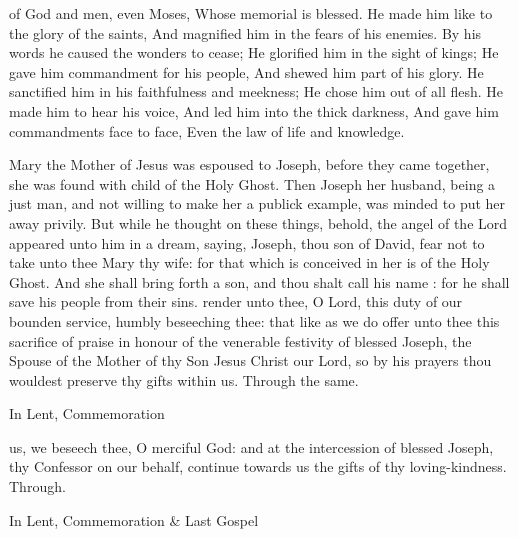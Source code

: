  of God and men, even Moses, Whose memorial is blessed. He made him like to the glory of the saints, And magnified him in the fears of his enemies. By his words he caused the wonders to cease; He glorified him in the sight of kings; He gave him commandment for his people, And shewed him part of his glory. He sanctified him in his faithfulness and meekness; He chose him out of all flesh. He made him to hear his voice, And led him into the thick darkness, And gave him commandments face to face, Even the law of life and knowledge.


\clearpage
{}
 Mary the Mother of Jesus was espoused to Joseph, before they came together, she was found with child of the Holy Ghost. Then Joseph her husband, being a just man, and not willing to make her a publick example, was minded to put her away privily. But while he thought on these things, behold, the angel of the Lord appeared unto him in a dream, saying, Joseph, thou son of David, fear not to take unto thee Mary thy wife: for that which is conceived in her is of the Holy Ghost. And she shall bring forth a son, and thou shalt call his name : for he shall save his people from their sins.
\secret
{} render unto thee, O Lord, this duty of our bounden service, humbly beseeching thee: that like as we do offer unto thee this sacrifice of praise in honour of the venerable festivity of blessed Joseph, the Spouse of the Mother of thy Son Jesus Christ our Lord, so by his prayers thou wouldest preserve thy gifts within us. Through the same.
\begin{rubric}
    In Lent, Commemoration 
\end{rubric}
\postcommunion
{} us, we beseech thee, O merciful God: and at the intercession of blessed Joseph, thy Confessor on our behalf, continue towards us the gifts of thy loving-kindness. Through.
\begin{rubric}
    In Lent, Commemoration \& Last Gospel 
\end{rubric}


